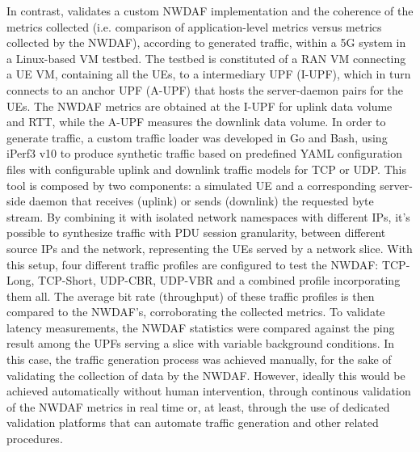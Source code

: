 In contrast, \cite{DataCollectionUsingNWDAF5GCN} validates a custom \acs{NWDAF} implementation and the coherence of the metrics collected (i.e. comparison of application-level metrics versus metrics collected by the \acs{NWDAF}), according to generated traffic, within a \acs{5G} system in a Linux-based \acs{VM} testbed. The testbed is constituted of a \acs{RAN} \acs{VM} connecting a \acs{UE} \acs{VM}, containing all the \acsp{UE}, to a intermediary \acs{UPF} (I-\acs{UPF}), which in turn connects to an anchor \acs{UPF} (A-\acs{UPF}) that hosts the server-daemon pairs for the \acsp{UE}. The \acs{NWDAF} metrics are obtained at the I-\acs{UPF} for uplink data volume and \acs{RTT}, while the A-\acs{UPF} measures the downlink data volume. In order to generate traffic, a custom traffic loader was developed in Go and Bash, using iPerf3 v10 to produce synthetic traffic based on predefined \acs{YAML} configuration files with configurable uplink and downlink traffic models for \acs{TCP} or \acs{UDP}. This tool is composed by two components: a simulated \acs{UE} and a corresponding server-side daemon that receives (uplink) or sends (downlink) the requested byte stream. By combining it with isolated network namespaces with different \acsp{IP}, it's possible to synthesize traffic with \acs{PDU} session granularity, between different source \acsp{IP} and the network, representing the \acsp{UE} served by a network slice. With this setup, four different traffic profiles are configured to test the \acs{NWDAF}: \acs{TCP}-Long, \acs{TCP}-Short, \acs{UDP}-\acs{CBR}, \acs{UDP}-\acs{VBR} and a combined profile incorporating them all. The average bit rate (throughput) of these traffic profiles is then compared to the \acs{NWDAF}'s, corroborating the collected metrics. To validate latency measurements, the \acs{NWDAF} statistics were compared against the ping result among the \acsp{UPF} serving a slice with variable background conditions. In this case, the traffic generation process was achieved manually, for the sake of validating the collection of data by the \acs{NWDAF}. However, ideally this would be achieved automatically without human intervention, through continous validation of the \acs{NWDAF} metrics in real time or, at least, through the use of dedicated validation platforms that can automate traffic generation and other related procedures.

